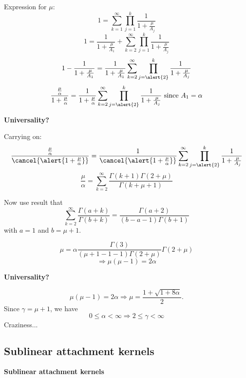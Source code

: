 \begin{frame}[label=]
\begin{frame}[label=]
\begin{frame}[label=]
\begin{frame}[label=]
\begin{frame}[label=]
\begin{frame}[label=]
\begin{frame}[label=]
\begin{frame}[label=]
\begin{frame}[label=]
\begin{frame}[label=]
\begin{frame}[label=]
\begin{frame}[label=]
\begin{frame}[label=]
\begin{frame}[label=]
\begin{frame}[label=]
\begin{frame}[label=]
\begin{frame}[label=]
\begin{frame}[label=]
\begin{frame}[label=]
\begin{frame}[label=]
\begin{frame}[label=]
\begin{frame}[label=]
\begin{frame}[label=]
\begin{frame}[label=]
\begin{overprint}
    Expression for $\mu$: 
    $$
    1 =
    \sum_{k=1}^{\infty} 
    \prod_{j=1}^{k}
    \frac{1}{1 + \frac{\mu}{A_j}}
    $$
    {
    $$
    1 =
    \frac{1}{1 + \frac{\mu}{A_1}}
    +
    \sum_{k=2}^{\infty} 
    \prod_{j=1}^{k}
    \frac{1}{1 + \frac{\mu}{A_j}}
    $$
    }
    {
    $$
    1 -
    \frac{1}{1 + \frac{\mu}{A_1}}
    =
    \frac{1}{1 + \frac{\mu}{A_1}}
    \sum_{k=2}^{\infty} 
    \prod_{j=\alert{2}}^{k}
    \frac{1}{1 + \frac{\mu}{A_j}}
    $$
    }
    {
    $$
    \frac{\frac{\mu}{\alpha}}{1 + \frac{\mu}{\alpha}}
    =
    \frac{1}{1 + \frac{\mu}{\alpha}}
    \sum_{k=2}^{\infty} 
    \prod_{j=\alert{2}}^{k}
    \frac{1}{1 + \frac{\mu}{A_j}}
    \mbox{\ since $A_1=\alpha$}
    $$
    }
  


  \textbf{Universality?}
  
  
   Carrying on:
    $$
    \frac{\frac{\mu}{\alpha}}{\cancel{\alert{1 + \frac{\mu}{\alpha}}}}
    =
    \frac{1}{\cancel{\alert{1 + \frac{\mu}{\alpha}}}}
    \sum_{k=2}^{\infty} 
    \prod_{j=\alert{2}}^{k}
    \frac{1}{1 + \frac{\mu}{A_j}}
    $$
    $$
    {
      \frac{\mu}{\alpha}
      =
      \sum_{k=2}^{\infty} 
      \frac{\Gamma(k+1)\Gamma(2+\mu)}{\Gamma(k+\mu+1)}
    }
    $$
  
    Now use result that\cite{krapivsky2001a}
    $$
    \sum_{k=2}^{\infty}
    \frac{\Gamma(a+k)}{\Gamma(b+k)}
    =
    \frac{\Gamma(a+2)}{(b-a-1)\Gamma(b+1)}
    $$
    with $a=1$ and $b=\mu+1$.
  
    $$
    \mu = \alpha \frac{\Gamma(3)}{(\mu+1-1-1)\Gamma(2+\mu)} \Gamma(2+\mu)
    $$
    {
      $$
      \Rightarrow \mu(\mu-1) = 2\alpha
      $$
    }
  


  \textbf{Universality?}

  
   
    $$
    \mu(\mu-1) = 2\alpha \Rightarrow \mu = \frac{1+\sqrt{1+8\alpha}}{2}.
    $$
   Since $\gamma = \mu+1$, we have
    $$
    0 \le \alpha < \infty \Rightarrow 2 \le \gamma < \infty
    $$
   Craziness...    
  


\subsection{Sublinear attachment kernels}

  \textbf{Sublinear attachment kernels}


\end{overprint}
\end{frame}
\end{frame}
\end{frame}
\end{frame}
\end{frame}
\end{frame}
\end{frame}
\end{frame}
\end{frame}
\end{frame}
\end{frame}
\end{frame}
\end{frame}
\end{frame}
\end{frame}
\end{frame}
\end{frame}
\end{frame}
\end{frame}
\end{frame}
\end{frame}
\end{frame}
\end{frame}
\end{frame}
